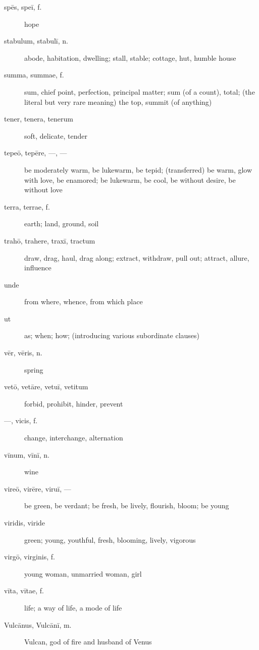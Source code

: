 \begin{description}
    \item[spēs, speī, f.] hope
    \item[stabulum, stabulī, n.] abode, habitation, dwelling; stall, stable; cottage, hut, humble house
    \item[summa, summae, f.] sum, chief point, perfection, principal matter; sum (of a count), total; (the literal but very rare meaning) the top, summit (of anything)
    \item[tener, tenera, tenerum] soft, delicate, tender
    \item[tepeō, tepēre, ---, ---] be moderately warm, be lukewarm, be tepid; (transferred) be warm, glow with love, be enamored; be lukewarm, be cool, be without desire, be without love
    \item[terra, terrae, f.] earth; land, ground, soil
    \item[trahō, trahere, traxī, tractum] draw, drag, haul, drag along; extract, withdraw, pull out; attract, allure, influence
    \item[unde] from where, whence, from which place
    \item[ut] as; when; how; (introducing various subordinate clauses)
    \item[vēr, vēris, n.] spring
    \item[vetō, vetāre, vetuī, vetitum] forbid, prohibit, hinder, prevent
    \item[---, vicis, f.] change, interchange, alternation
    \item[vīnum, vīnī, n.] wine
    \item[vireō, virēre, viruī, ---] be green, be verdant; be fresh, be lively, flourish, bloom; be young
    \item[viridis, viride] green; young, youthful, fresh, blooming, lively, vigorous
    \item[virgō, virginis, f.] young woman, unmarried woman, girl
    \item[vīta, vītae, f.] life; a way of life, a mode of life
    \item[Vulcānus, Vulcānī, m.] Vulcan, god of fire and husband of Venus
\end{description}
